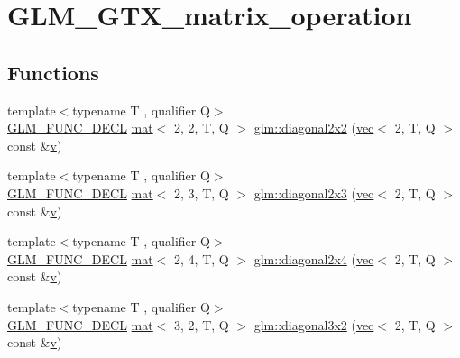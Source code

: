 \hypertarget{group__gtx__matrix__operation}{}\section{G\+L\+M\+\_\+\+G\+T\+X\+\_\+matrix\+\_\+operation}
\label{group__gtx__matrix__operation}
\subsection*{Functions}
\begin{DoxyCompactItemize}
\item 
{\footnotesize template$<$typename T , qualifier Q$>$ }\\\mbox{\hyperlink{setup_8hpp_ab2d052de21a70539923e9bcbf6e83a51}{G\+L\+M\+\_\+\+F\+U\+N\+C\+\_\+\+D\+E\+CL}} \mbox{\hyperlink{structglm_1_1mat}{mat}}$<$ 2, 2, T, Q $>$ \mbox{\hyperlink{group__gtx__matrix__operation_ga58a32a2beeb2478dae2a721368cdd4ac}{glm\+::diagonal2x2}} (\mbox{\hyperlink{structglm_1_1vec}{vec}}$<$ 2, T, Q $>$ const \&\mbox{\hyperlink{_s_d_l__opengl_8h_a10a82eabcb59d2fcd74acee063775f90}{v}})
\item 
{\footnotesize template$<$typename T , qualifier Q$>$ }\\\mbox{\hyperlink{setup_8hpp_ab2d052de21a70539923e9bcbf6e83a51}{G\+L\+M\+\_\+\+F\+U\+N\+C\+\_\+\+D\+E\+CL}} \mbox{\hyperlink{structglm_1_1mat}{mat}}$<$ 2, 3, T, Q $>$ \mbox{\hyperlink{group__gtx__matrix__operation_gab69f900206a430e2875a5a073851e175}{glm\+::diagonal2x3}} (\mbox{\hyperlink{structglm_1_1vec}{vec}}$<$ 2, T, Q $>$ const \&\mbox{\hyperlink{_s_d_l__opengl_8h_a10a82eabcb59d2fcd74acee063775f90}{v}})
\item 
{\footnotesize template$<$typename T , qualifier Q$>$ }\\\mbox{\hyperlink{setup_8hpp_ab2d052de21a70539923e9bcbf6e83a51}{G\+L\+M\+\_\+\+F\+U\+N\+C\+\_\+\+D\+E\+CL}} \mbox{\hyperlink{structglm_1_1mat}{mat}}$<$ 2, 4, T, Q $>$ \mbox{\hyperlink{group__gtx__matrix__operation_ga30b4dbfed60a919d66acc8a63bcdc549}{glm\+::diagonal2x4}} (\mbox{\hyperlink{structglm_1_1vec}{vec}}$<$ 2, T, Q $>$ const \&\mbox{\hyperlink{_s_d_l__opengl_8h_a10a82eabcb59d2fcd74acee063775f90}{v}})
\item 
{\footnotesize template$<$typename T , qualifier Q$>$ }\\\mbox{\hyperlink{setup_8hpp_ab2d052de21a70539923e9bcbf6e83a51}{G\+L\+M\+\_\+\+F\+U\+N\+C\+\_\+\+D\+E\+CL}} \mbox{\hyperlink{structglm_1_1mat}{mat}}$<$ 3, 2, T, Q $>$ \mbox{\hyperlink{group__gtx__matrix__operation_ga832c805d5130d28ad76236958d15b47d}{glm\+::diagonal3x2}} (\mbox{\hyperlink{structglm_1_1vec}{vec}}$<$ 2, T, Q $>$ const \&\mbox{\hyperlink{_s_d_l__opengl_8h_a10a82eabcb59d2fcd74acee063775f90}{v}})

\end{DoxyCompactItemize}
